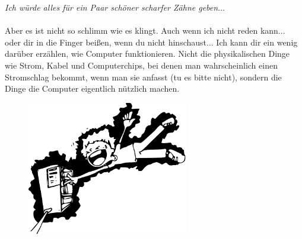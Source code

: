 \emph{Ich würde alles für ein Paar schöner scharfer Zähne geben$\ldots$}
\\
\\
Aber es ist nicht so schlimm wie es klingt. Auch wenn ich nicht reden kann... oder dir in die Finger beißen, wenn du nicht hinschaust... Ich kann dir ein wenig darüber erzählen, wie Computer funktionieren. Nicht die physikalischen Dinge wie Strom, Kabel und Computerchips, bei denen man wahrscheinlich einen Stromschlag bekommt, wenn man sie anfasst (tu es bitte nicht), sondern die Dinge die Computer eigentlich nützlich machen.

\begin{figure}
  \begin{center}
\includegraphics*[width=70mm]{images/electrocute}
  \end{center}
\end{figure}

